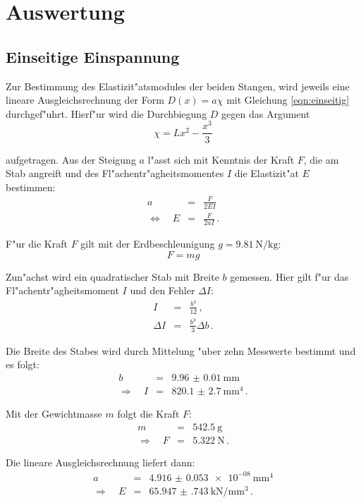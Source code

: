 \section{Auswertung}
	\label{sec:auswertung}

	\subsection{Einseitige Einspannung}
	\label{subsec:einseitig}
		Zur Bestimmung des Elastizit"atsmodules der beiden Stangen, wird jeweils eine lineare Ausgleichsrechnung der Form $D(x) = a\chi$ mit Gleichung \eqref{eqn:einseitig} durchgef"uhrt.
		Hierf"ur wird die Durchbiegung $D$ gegen das Argument
		\begin{equation*}
			\chi = Lx^2 - \frac{x^3}{3}
		\end{equation*}

		aufgetragen. Aus der Steigung $a$ l"asst sich mit Kenntnis der Kraft $F$, die am Stab angreift und des Fl"achentr"agheitsmomentes $I$ die Elastizit"at $E$ bestimmen:
		\begin{eqnarray*}
			a & = & \frac{F}{2EI} \\
			\Leftrightarrow \quad E & = & \frac{F}{2aI} \,.
		\end{eqnarray*}

		F"ur die Kraft $F$ gilt mit der Erdbeschleunigung $g = \SI{9.81}{\newton \per \kilo \gram}$:
		\begin{equation*}
			F = mg
		\end{equation*}

		Zun"achst wird ein quadratischer Stab mit Breite $b$ gemessen. Hier gilt f"ur das Fl"achentr"agheitsmoment $I$ und den Fehler $\Delta I$:
		\begin{eqnarray*}
			I & = & \frac{b^4}{12} \,, \\
			\Delta I & = & \frac{b^3}{3}\Delta b \,.
		\end{eqnarray*}

		Die Breite des Stabes wird durch Mittelung "uber zehn Messwerte bestimmt und es folgt:
		\begin{eqnarray*}
			b & = & \SI{9.96(1)}{\milli \meter} \, \\
			\Rightarrow \quad I & = & \SI{820.1(27)}{\milli \meter \tothe{4}} \,. 
		\end{eqnarray*}

		Mit der Gewichtmasse $m$ folgt die Kraft $F$:
		\begin{eqnarray*}
			m & = & \SI{542.5}{\gram} \, \\
			\Rightarrow \quad F & = & \SI{5.322}{\newton} \,.
		\end{eqnarray*}

		Die lineare Ausgleichsrechnung liefert dann:
		\begin{eqnarray*}
			a & = & \SI{4.916(53)e-08}{\milli \meter \tothe{4}} \\
			\Rightarrow \quad E & = & \SI{65.947(743)}{\kilo \newton \per \milli \meter \cubed} \,.
		\end{eqnarray*}

